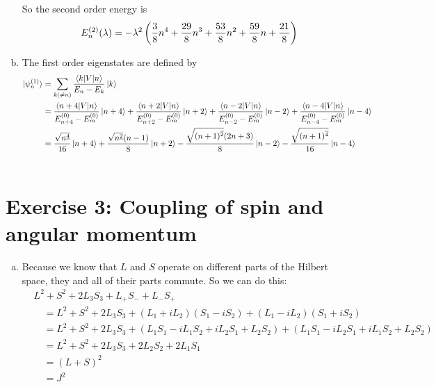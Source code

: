 \documentclass[a4paper,german,12pt,smallheadings]{scrartcl}
\begin{document}
\begin{enumerate}[a)]
    So the second order energy is
    \begin{equation*}
      E_n^{(2)}(\lambda)  = -\lambda^2 \del{\frac{3}{8}n^4 + \frac{29}{8}n^3 + \frac{53}{8}n^2 + \frac{59}{8} n + \frac{21}{8}}
    \end{equation*}

  \item
    The first order eigenstates are defined by
    \begin{align*}
      \ket{\psi_n^{(1)}} &= \sum_{k (\neq n)} \frac{\braket{k|V|n}}{E_n - E_k} \ket{k} \\
      &=
      \frac{\braket{n+4|V|n}}{E^{(0)}_{n+4} - E^{(0)}_{m}} \ket{n+4} +
      \frac{\braket{n+2|V|n}}{E^{(0)}_{n+2} - E^{(0)}_{m}} \ket{n+2} +
      \frac{\braket{n-2|V|n}}{E^{(0)}_{n-2} - E^{(0)}_{m}} \ket{n-2} +
      \frac{\braket{n-4|V|n}}{E^{(0)}_{n-4} - E^{(0)}_{m}} \ket{n-4} \\
      &= 
      \frac{\sqrt{n^{\underline 4}}}{16} \ket{n+4}
      +\frac{\sqrt{n^{\underline 2}}(n-1)}{8} \ket{n+2}
      -\frac{\sqrt{(n+1)^{\overline 2}}(2n+3)}{8} \ket{n-2}
      -\frac{\sqrt{(n+1)^{\overline 4}}}{16} \ket{n-4} \\\
    \end{align*}

\end{enumerate}

\section*{Exercise 3: Coupling of spin and angular momentum}
\begin{enumerate}[a)]
  \item
    Because we know that $L$ and $S$ operate on different parts of the Hilbert
    space, they and all of their parts commute. So we can do this:
    \begin{align*}
      &L^2 + S^2 + 2 L_3 S_3 + L_+ S_- + L_- S_+ \\
      &\quad = L^2 + S^2 + 2 L_3 S_3 + (L_1+iL_2) (S_1-iS_2) + (L_1-iL_2)(S_1 + iS_2) \\
      &\quad = L^2 + S^2 + 2 L_3 S_3 + (L_1S_1 -iL_1S_2 +iL_2S_1 +L_2S_2) + (L_1S_1 - iL_2S_1 + iL_1S_2 + L_2S_2) \\
      &\quad = L^2 + S^2 + 2 L_3 S_3 + 2L_2S_2 + 2L_1S_1 \\
      &\quad = (L+S)^2 \\
      &\quad = J^2 \\
    \end{align*}
\end{enumerate}
\end{document}
